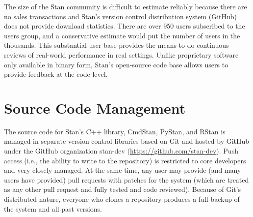 The size of the Stan community is difficult to estimate reliably
because there are no sales transactions and Stan's version control
distribution system (GitHub) does not provide download statistics.
There are over 950 users subscribed to the users group, and a
conservative estimate would put the number of users in the thousands.
This substantial user base provides the means to do continuous reviews
of real-world performance in real settings. Unlike proprietary
software only available in binary form, Stan's open-source code base
allows users to provide feedback at the code level.

\section{Source Code Management}

The source code for Stan's C++ library, CmdStan, PyStan, and RStan is
managed in separate version-control libraries based on Git
\citep{Chacon:2014} and hosted by GitHub under the GitHub organization
stan-dev (\url{https://github.com/stan-dev}). Push access (i.e., the
ability to write to the repository) is restricted to core developers
and very closely managed. At the same time, any user may provide (and
many users have provided) pull requests with patches for the system
(which are treated as any other pull request and fully tested and code
reviewed). Because of Git's distributed nature, everyone who clones a
repository produces a full backup of the system and all past versions.

